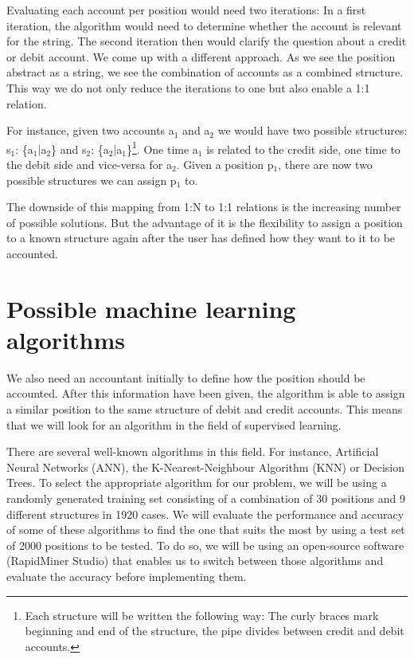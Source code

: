 Evaluating each account per position would need two iterations: In a first iteration, the algorithm would need to determine whether the account is relevant for the string. The second iteration then would clarify the question about a credit or debit account.%
We come up with a different approach. As we see the position abstract as a string, we see the combination of accounts as a combined structure. This way we do not only reduce the iterations to one but also enable a 1:1 relation.

For instance, given two accounts a$_1$ and a$_2$ we would have two possible structures: s$_1$: \{a$_1$$|$a$_2$\} and s$_2$: \{a$_2$$|$a$_1$\}\footnote{Each structure will be written the following way: The curly braces mark beginning and end of the structure, the pipe divides between credit and debit accounts.}. One time a$_1$ is related to the credit side, one time to the debit side and vice-versa for a$_2$. Given a position p$_1$, there are now two possible structures we can assign p$_1$ to.

The downside of this mapping from 1:N to 1:1 relations is the increasing number of possible solutions. But the advantage of it is the flexibility to assign a position to a known structure again after the user has defined how they want to it to be accounted.

\section{Possible machine learning algorithms}
\label{sec4.2}
We also need an accountant initially to define how the position should be accounted. After this information have been given, the algorithm is able to assign a similar position to the same structure of debit and credit accounts. This means that we will look for an algorithm in the field of supervised learning.

There are several well-known algorithms in this field. For instance, Artificial Neural Networks (ANN), the K-Nearest-Neighbour Algorithm (KNN) or Decision Trees. To select the appropriate algorithm for our problem, we will be using a randomly generated training set consisting of a combination of 30 positions and 9 different structures in 1920 cases. We will evaluate the performance and accuracy of some of these algorithms to find the one that suits the most by using a test set of 2000 positions to be tested. To do so, we will be using an open-source software (RapidMiner Studio) that enables us to switch between those algorithms and evaluate the accuracy before implementing them.

